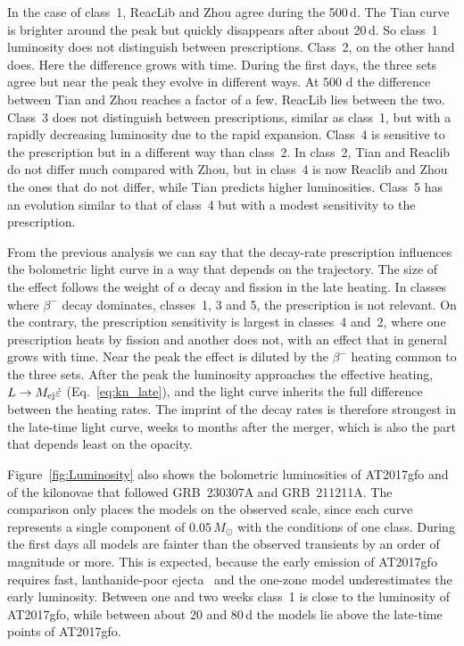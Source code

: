 In the case of class~1, ReacLib and Zhou agree during the 500\,d.
The Tian curve is brighter around the peak but quickly disappears after about 20\,d.
So class~1 luminosity does not distinguish between prescriptions.
Class~2, on the other hand does.
Here the difference grows with time.
During the first days, the three sets agree but near the peak they evolve in different ways.
At 500 d the difference between Tian and Zhou reaches a factor of a few.
ReacLib lies between the two.
Class~3 does not distinguish between prescriptions, similar as class~1, but with a rapidly decreasing luminosity due to the rapid expansion.
Class~4 is sensitive to the prescription but in a different way than class~2.
In class~2, Tian and Reaclib do not differ much compared with Zhou, but in class~4 is now Reaclib and Zhou the ones that do not differ, while Tian predicts higher luminosities.
Class~5 has an evolution similar to that of class~4 but with a modest sensitivity to the prescription. 

From the previous analysis we can say that the decay-rate prescription influences the bolometric light curve in a way that depends on the trajectory.
The size of the effect follows the weight of $\alpha$ decay and fission in the late heating.
In classes where $\beta^-$ decay dominates, classes~1, 3 and 5, the prescription is not relevant.
On the contrary, the prescription sensitivity is largest in classes~4 and~2, where one prescription heats by fission and another does not, with an effect that in general grows with time.
Near the peak the effect is diluted by the $\beta^-$ heating common to the three sets.
After the peak the luminosity approaches the effective heating, $L\to M_{\rm ej}\dot\varepsilon$ (Eq.~\ref{eq:kn_late}), and the light curve inherits the full difference between the heating rates.
The imprint of the decay rates is therefore strongest in the late-time light curve, weeks to months after the merger, which is also the part that depends least on the opacity.

Figure~\ref{fig:Luminosity} also shows the bolometric luminosities of AT2017gfo and of the kilonovae that followed GRB~230307A and GRB~211211A.
The comparison only places the models on the observed scale, since each curve represents a single component of $0.05\,M_\odot$ with the conditions of one class.
During the first days all models are fainter than the observed transients by an order of magnitude or more.
This is expected, because the early emission of AT2017gfo requires fast, lanthanide-poor ejecta~\cite{villar_combined_2017} and the one-zone model underestimates the early luminosity.
Between one and two weeks class~1 is close to the luminosity of AT2017gfo, while between about 20 and 80\,d the models lie above the late-time points of AT2017gfo. 
